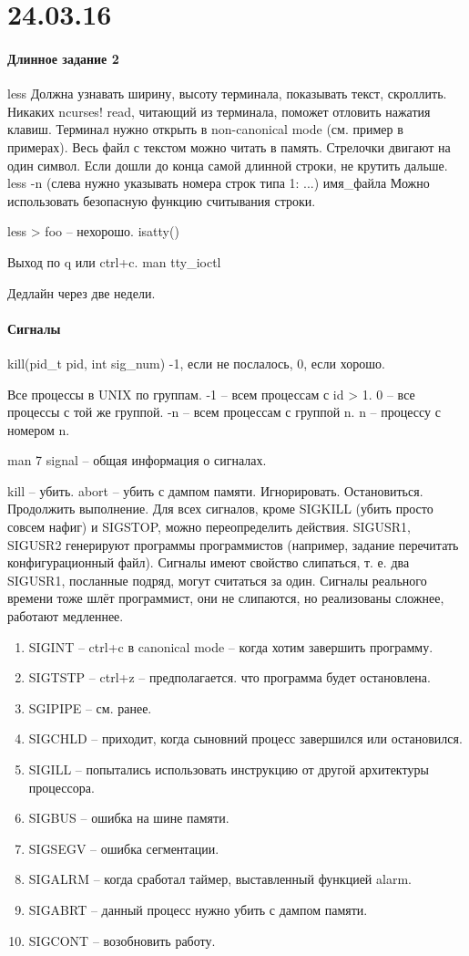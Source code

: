 \documentclass[a4paper,10pt]{article}
\begin{document}
\section{24.03.16}
\paragraph{Длинное задание 2}
less
Должна узнавать ширину, высоту терминала, показывать текст, скроллить. Никаких ncurses! read, читающий из терминала, поможет отловить нажатия клавиш. Терминал нужно открыть в non-canonical mode (см. пример в примерах).
Весь файл с текстом можно читать в память. Стрелочки двигают на один символ. Если дошли до конца самой длинной строки, не крутить дальше.
less -n (слева нужно указывать номера строк типа 1: ...) имя\_файла
Можно использовать безопасную функцию считывания строки.

less > foo -- нехорошо. isatty()

Выход по q или ctrl+c.
man tty\_ioctl

Дедлайн через две недели.

\paragraph{Сигналы}
kill(pid\_t pid, int sig\_num)
-1, если не послалось, 0, если хорошо.

Все процессы в UNIX по группам. -1 -- всем процессам с id > 1. 0 -- все процессы с той же группой. -n -- всем процессам с группой n. n -- процессу с номером n.

man 7 signal -- общая информация о сигналах. 

kill -- убить.
abort -- убить с дампом памяти.
Игнорировать.
Остановиться.
Продолжить выполнение.
Для всех сигналов, кроме SIGKILL (убить просто совсем нафиг) и SIGSTOP, можно переопределить действия.
SIGUSR1, SIGUSR2 генерируют программы программистов (например, задание перечитать конфигурационный файл).
Сигналы имеют свойство слипаться, т. е. два SIGUSR1, посланные подряд, могут считаться за один. 
Сигналы реального времени тоже шлёт программист, они не слипаются, но реализованы сложнее, работают медленнее.

\begin{enumerate}
\item SIGINT -- ctrl+c в canonical mode -- когда хотим завершить программу.
\item SIGTSTP -- ctrl+z -- предполагается. что программа будет остановлена.
\item SGIPIPE -- см. ранее.
\item SIGCHLD -- приходит, когда сыновний процесс завершился или остановился.
\item SIGILL -- попытались использовать инструкцию от другой архитектуры процессора.
\item SIGBUS -- ошибка на шине памяти.
\item SIGSEGV -- ошибка сегментации.
\item SIGALRM -- когда сработал таймер, выставленный функцией alarm.
\item SIGABRT -- данный процесс нужно убить с дампом памяти.
\item SIGCONT -- возобновить работу.
\end{enumerate}
\end{document}
